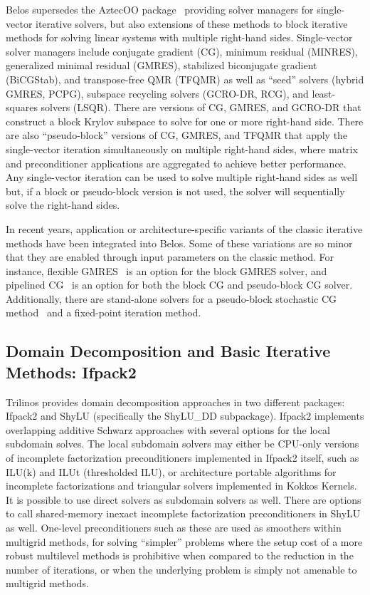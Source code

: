 Belos supersedes the AztecOO package~\cite{Heroux2004a} providing solver managers for single-vector 
iterative solvers, but also extensions of these methods to block iterative methods for solving linear 
systems with multiple right-hand sides.  Single-vector solver managers include conjugate gradient (CG),
minimum residual (MINRES), generalized minimal residual (GMRES), stabilized biconjugate gradient (BiCGStab),
and transpose-free QMR (TFQMR) as well as ``seed'' solvers (hybrid GMRES, PCPG), subspace recycling solvers 
(GCRO-DR, RCG), and least-squares solvers (LSQR).  There are versions of CG, GMRES, and GCRO-DR that construct
a block Krylov subspace to solve for one or more right-hand side.  There are also ``pseudo-block'' versions
of CG, GMRES, and TFQMR that apply the single-vector iteration simultaneously on multiple right-hand sides,
where matrix and preconditioner applications are aggregated to achieve better performance.  Any single-vector
iteration can be used to solve multiple right-hand sides as well but, if a block or pseudo-block version
is not used, the solver will sequentially solve the right-hand sides.

In recent years, application or architecture-specific variants of the classic iterative methods have been 
integrated into Belos.  Some of these variations are so minor that they are enabled through input
parameters on the classic method.  For instance, flexible GMRES~\cite{Saad1993a} is an option for the block 
GMRES solver, and pipelined CG~\cite{GHYSELS2014224} is an option for both the block CG and pseudo-block CG 
solver.  Additionally, there are stand-alone solvers for a pseudo-block stochastic CG method~\cite{Parker2012SamplingGD}
and a fixed-point iteration method.

    
\subsection{Domain Decomposition and Basic Iterative Methods: Ifpack2}

Trilinos provides domain decomposition approaches in two different
packages: Ifpack2 and ShyLU (specifically the ShyLU\_DD
subpackage). Ifpack2 implements overlapping additive Schwarz
approaches with several options for the local subdomain solves. The
local subdomain solvers may either be CPU-only versions of incomplete
factorization preconditioners implemented in Ifpack2 itself, such as
ILU(k) and ILUt (thresholded ILU), or architecture portable algorithms
for incomplete factorizations and triangular solvers implemented in
Kokkos Kernels. It is possible to use direct solvers as subdomain
solvers as well. There are options to call shared-memory inexact
incomplete factorization preconditioners in ShyLU as well. One-level
preconditioners such as these are used as smoothers within multigrid
methods, for solving ``simpler'' problems where the setup cost of a
more robust multilevel methods is prohibitive when compared to the
reduction in the number of iterations, or when the underlying problem
is simply not amenable to multigrid methods. 

